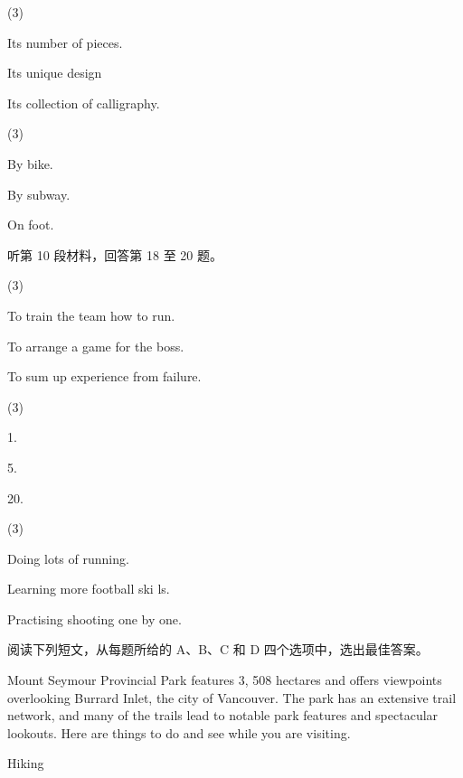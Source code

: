 \documentclass{英语试卷}
\begin{document}
\begin{choices}(3)
  \item Its number of pieces.
  \item Its unique design
  \item Its collection of calligraphy.
\end{choices}
\begin{choices}(3)
  \item By bike.
  \item By subway.
  \item On foot.
\end{choices}
\par 听第 10 段材料，回答第 18 至 20 题。\par
{}
\begin{choices}(3)
  \item To train the team how to run.
  \item To arrange a game for the boss.
  \item To sum up experience from failure.
\end{choices}
\begin{choices}(3)
  \item 1.
  \item 5.
  \item 20.
\end{choices}
\begin{choices}(3)
  \item Doing lots of running.
  \item Learning more football ski ls.
  \item Practising shooting one by one.
\end{choices}
\par 阅读下列短文，从每题所给的 A、B、C 和 D 四个选项中，选出最佳答案。\par
{}
\par Mount Seymour Provincial Park features 3, 508 hectares and offers viewpoints overlooking Burrard Inlet, the city of Vancouver. The park has an extensive trail network, and many of the trails lead to notable park features and spectacular lookouts. Here are things to do and see while you are visiting.\par
\par Hiking\par
\end{document}
